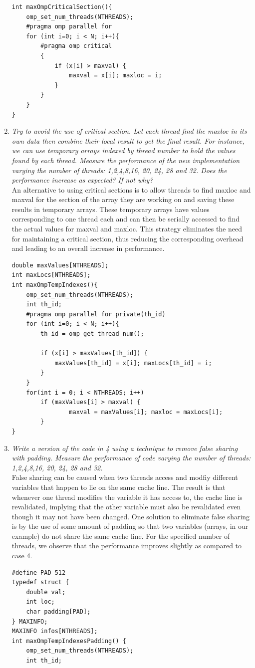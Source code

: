 \documentclass[12pt]{article}
\begin{document}
\begin{enumerate}
    \begin{lstlisting}[style=CStyle]
int maxOmpCriticalSection(){
	omp_set_num_threads(NTHREADS);
	#pragma omp parallel for
	for (int i=0; i < N; i++){
		#pragma omp critical 
		{
			if (x[i] > maxval) {
				maxval = x[i]; maxloc = i;
			}
		}
	}
}
    \end{lstlisting}
    \item \textit{Try to avoid the use of critical section. Let each thread find the maxloc in its own data then combine their local result to get the final result. For instance, we can use temporary arrays indexed by thread number to hold the values found by each thread. Measure the performance of the new implementation varying the number of threads: 1,2,4,8,16, 20, 24, 28 and 32. Does the performance increase as expected? If not why?}\\
    An alternative to using critical sections is to allow threads to find maxloc and maxval for the section of the array they are working on and saving these results in temporary arrays. These temporary arrays have values corresponding to one thread each and can then be serially accessed to find the actual values for maxval and maxloc. This strategy eliminates the need for maintaining a critical section, thus reducing the corresponding overhead and leading to an overall increase in performance.\\
    
    \begin{lstlisting}[style=CStyle]
double maxValues[NTHREADS];
int maxLocs[NTHREADS];
int maxOmpTempIndexes(){
	omp_set_num_threads(NTHREADS);
	int th_id;
	#pragma omp parallel for private(th_id)
	for (int i=0; i < N; i++){
		th_id = omp_get_thread_num();
		
		if (x[i] > maxValues[th_id]) {
			maxValues[th_id] = x[i]; maxLocs[th_id] = i;
		}
	}
	for(int i = 0; i < NTHREADS; i++)
		if (maxValues[i] > maxval) {
				maxval = maxValues[i]; maxloc = maxLocs[i];
		}
}
    \end{lstlisting}
    \item \textit{Write a version of the code in 4 using a technique to remove false sharing with padding. Measure the performance of code varying the number of threads: 1,2,4,8,16, 20, 24, 28 and 32.}\\
    False sharing can be caused when two threads access and modfiy different variables that happen to lie on the same cache line. The result is that whenever one thread modifies the variable it has access to, the cache line is revalidated, implying that the other variable must also be revalidated even though it may not have been changed. One solution to eliminate false sharing is by the use of some amount of padding so that two variables (arrays, in our example) do not share the same cache line. For the specified number of threads, we observe that the performance improves slightly as compared to case 4. \\
    \begin{lstlisting}[style=CStyle]
#define PAD 512
typedef struct {
	double val;
	int loc;
	char padding[PAD];
} MAXINFO;
MAXINFO infos[NTHREADS];
int maxOmpTempIndexesPadding() {
	omp_set_num_threads(NTHREADS);
	int th_id;


\end{lstlisting}
\end{enumerate}
\end{document}
